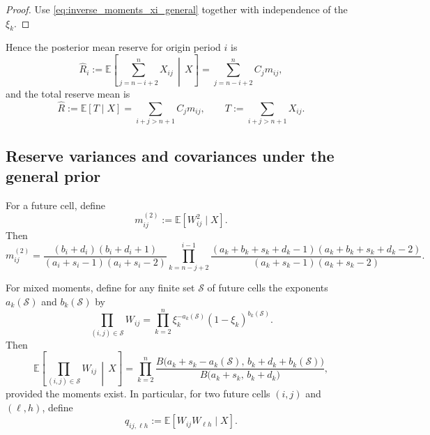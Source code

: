 \documentclass[11pt]{article}
\newcommand{\E}{\mathbb{E}}
\newcommand{\1}{\mathbf{1}}
\begin{document}
\begin{proof}
Use \eqref{eq:inverse_moments_xi_general} together with independence of the $\xi_k$.
\end{proof}

Hence the posterior mean reserve for origin period $i$ is
\begin{equation}
\widehat{R}_i
:= \E\!\left[\sum_{j=n-i+2}^{n} X_{ij}\,\middle|\,X\right]
= \sum_{j=n-i+2}^{n} C_j m_{ij},
\label{eq:row_reserve_mean_general}
\end{equation}
and the total reserve mean is
\begin{equation}
\widehat{R}
:= \E[T\mid X]
= \sum_{i+j>n+1} C_j m_{ij},
\qquad
T:=\sum_{i+j>n+1}X_{ij}.
\label{eq:total_reserve_mean_general}
\end{equation}

\subsection{Reserve variances and covariances under the general prior}

For a future cell, define
\begin{equation}
m^{(2)}_{ij}:=\E[W_{ij}^2\mid X].
\label{eq:second_moment_name_general}
\end{equation}
Then
\begin{equation}
m^{(2)}_{ij}
=
\frac{(b_i+d_i)(b_i+d_i+1)}{(a_i+s_i-1)(a_i+s_i-2)}
\prod_{k=n-j+2}^{i-1}
\frac{(a_k+b_k+s_k+d_k-1)(a_k+b_k+s_k+d_k-2)}{(a_k+s_k-1)(a_k+s_k-2)}.
\label{eq:second_moment_mij_general}
\end{equation}

For mixed moments, define for any finite set $\mathcal S$ of future cells the exponents $a_k(\mathcal S)$ and $b_k(\mathcal S)$ by
\begin{equation}
\prod_{(i,j)\in\mathcal S} W_{ij}
=
\prod_{k=2}^{n} \xi_k^{-a_k(\mathcal S)} (1-\xi_k)^{b_k(\mathcal S)}.
\label{eq:generic_exponents}
\end{equation}
Then
\begin{equation}
\E\!\left[\prod_{(i,j)\in\mathcal S} W_{ij}\,\middle|\,X\right]
=
\prod_{k=2}^{n}
\frac{B\bigl(a_k+s_k-a_k(\mathcal S),\,b_k+d_k+b_k(\mathcal S)\bigr)}{B\bigl(a_k+s_k,\,b_k+d_k\bigr)},
\label{eq:generic_mixed_moment_general}
\end{equation}
provided the moments exist. In particular, for two future cells $(i,j)$ and $(\ell,h)$, define
\begin{equation}
q_{ij,\ell h}:=\E[W_{ij}W_{\ell h}\mid X].
\label{eq:q_mixed_general}
\end{equation}
\end{document}
